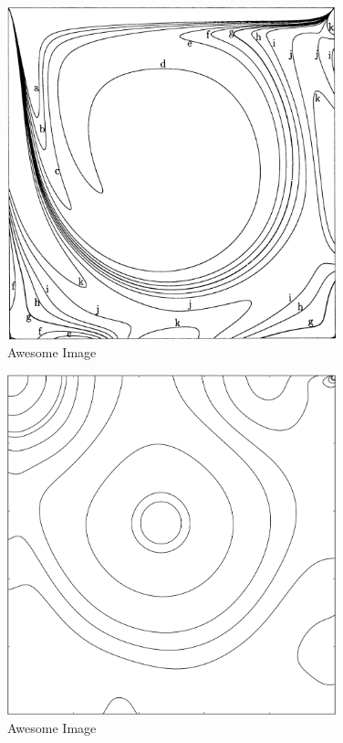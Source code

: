 \begin{figure}[p]
    \centering
    \includegraphics[width=0.85\textwidth]{Images/vorticity.png}
    \caption{Awesome Image}
    \label{fig:awesome_image}
\end{figure}

\begin{figure}[p]
    \centering
    \includegraphics[width=0.85\textwidth]{Images/pressure.pdf}
    \caption{Awesome Image}
    \label{fig:awesome_image}
\end{figure}


